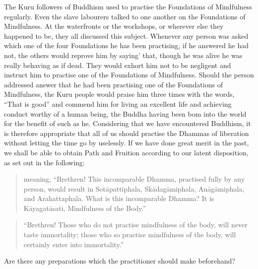 \documentclass[a5paper,10pt,english]{book}
\begin{document}
\sphinxAtStartPar
The Kuru followers of Buddhism used to practise the Foundations of Mindfulness regularly. Even the slave labourers talked to one another on the Foundations of Mindfulness. At the waterfronts or the workshops, or wherever else they happened to be, they all discussed this subject. Whenever any person was asked which one of the four Foundations he has been practising, if he answered he had not, the others would reprove him by saying’ that, though he was alive he was really behaving as if dead. They would exhort him not to be negligent and instruct him to practise one of the Foundations of Mindfulness. Should the person addressed answer that he had been practising one of the Foundations of Mindfulness, the Kuru people would praise him three times with the words, “That is good” and commend him for living an excellent life and achieving conduct worthy of a human being, the Buddha having been bom into the world for the benefit of such as he. Considering that we have encountered Buddhism, it is therefore appropriate that all of us should practise the Dhammas of liberation without letting the time go by uselessly. If we have done great merit in the past, we shall be able to obtain Path and Fruition according to our latent disposition, as set out in the following:

\sphinxAtStartPar
{}
\begin{quote}

\sphinxAtStartPar
meaning, “Brethren! This incomparable Dhamma, practised fully by any person, would result in Sotāpattiphala, Skādagāmiphala, Anāgāmiphala, and Arahattaphala. What is this incomparable Dhamma? It is Kāyagatāsati, Mindfulness of the Body.”
\end{quote}

\sphinxAtStartPar
{}
\begin{quote}

\sphinxAtStartPar
“Brethren! Those who do not practise mindfulness of the body, will never taste immortality; those who so practise mindfulness of the body, will certainly enter into immortality.”
\end{quote}

\sphinxAtStartPar
{} Are there any preparations which the practitioner should make beforehand?
\end{document}
